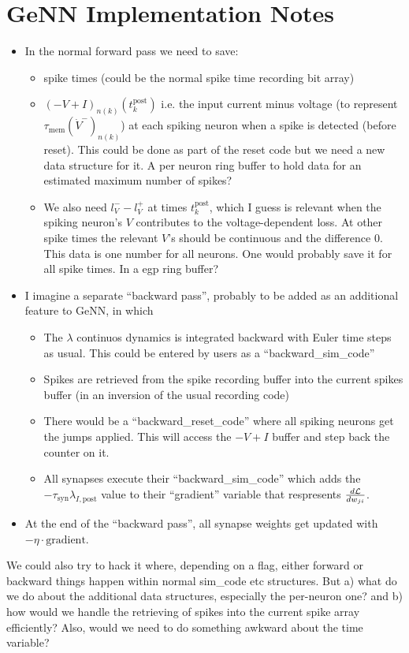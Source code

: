 \documentclass[a4paper]{article}
\begin{document}
\section{GeNN Implementation Notes}
\begin{itemize}
\item In the normal forward pass we need to save:
  \begin{itemize}
    \item spike times (could be the normal spike time recording bit array)
    \item $(-V+I)_{n(k)}(t_k^{\text{post}})$ i.e. the input current
      minus voltage (to represent $\tau_{\text{mem}}
      (\dot{V}^-)_{n(k)}$) at each spiking neuron when a spike is
      detected (before reset). This could be done as part of the reset
      code but we need a new data structure for it. A per neuron ring
      buffer to hold data for an estimated maximum number of spikes?
    \item We also need $l_V^- - l_V^+$ at times $t_k^{\text{post}}$,
      which I guess is relevant when the spiking neuron's $V$
      contributes to the voltage-dependent loss. At other spike times
      the relevant $V$'s should be continuous and the difference
      $0$. This data is one number for all neurons. One would probably
      save it for all spike times. In a egp ring buffer?
  \end{itemize}
\item I imagine a separate ``backward pass'', probably to be added as
  an additional feature to GeNN, in which
  \begin{itemize}
  \item The $\lambda$ continuos dynamics is integrated backward with Euler
    time steps as usual. This could be entered by users as a
    ``backward\_sim\_code''
  \item Spikes are retrieved from the spike recording buffer into
    the current spikes buffer (in an inversion of the usual
    recording code)
  \item There would be a ``backward\_reset\_code'' where all
    spiking neurons get the jumps applied. This will access the
    $-V+I$ buffer and step back the counter on it.
  \item All synapses execute their ``backward\_sim\_code'' which
    adds the $-\tau_{\text{syn}} \lambda_{I,\text{post}}$ value to
    their ``gradient'' variable that respresents $\frac{d \cal
      L}{d w_{ji}}$.
  \end{itemize}
\item At the end of the ``backward pass'', all synapse weights get updated
  with $-\eta \cdot \text{gradient}$.
\end{itemize}

  We could also try to hack it where, depending on a flag, either
  forward or backward things happen within normal sim\_code etc
  structures.  But a) what do we do about the additional data
  structures, especially the per-neuron one? and b) how would we
  handle the retrieving of spikes into the current spike array
  efficiently? Also, would we need to do something awkward about the
  time variable?
\end{document}

